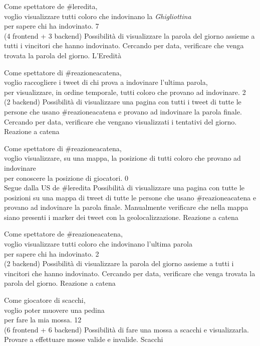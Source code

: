 \userstory%
{Come spettatore de \#leredita,\\voglio visualizzare tutti coloro che indovinano la \textit{Ghigliottina}\\per sapere chi ha indovinato.}%
{7\\(4 frontend + 3 backend)}%
{Possibilità di visualizzare la parola del giorno assieme a tutti i vincitori che hanno indovinato.}%
{Cercando per data, verificare che venga trovata la parola del giorno.}
{L'Eredità}

\userstory%
{Come spettatore di \#reazioneacatena,\\voglio raccogliere i tweet di chi prova a indovinare l'ultima parola,\\per visualizzare, in ordine temporale, tutti coloro che provano ad indovinare.}%
{2\\(2 backend)}%
{Possibilità di visualizzare una pagina con tutti i tweet di tutte le persone che usano \#reazioneacatena e provano ad indovinare la parola finale.}%
{Cercando per data, verificare che vengano visualizzati i tentativi del giorno.}
{Reazione a catena}

\userstory%
{Come spettatore di \#reazioneacatena,\\voglio visualizzare, su una mappa, la posizione di tutti coloro che provano ad indovinare\\per conoscere la posizione di giocatori.}%
{0\\Segue dalla US de \#leredita}%
{Possibilità di visualizzare una pagina con tutte le posizioni su una mappa di tweet di tutte le persone che usano \#reazioneacatena e provano ad indovinare la parola finale.}%
{Manualmente verificare che nella mappa siano presenti i marker dei tweet con la geolocalizzazione.}
{Reazione a catena}

\userstory%
{Come spettatore de \#reazioneacatena,\\voglio visualizzare tutti coloro che indovinano l'ultima parola\\per sapere chi ha indovinato.}%
{2\\(2 backend)}%
{Possibilità di visualizzare la parola del giorno assieme a tutti i vincitori che hanno indovinato.}%
{Cercando per data, verificare che venga trovata la parola del giorno.}
{Reazione a catena}

\userstory%
{Come giocatore di scacchi,\\voglio poter muovere una pedina\\per fare la mia mossa.}%
{12\\(6 frontend + 6 backend)}%
{Possibilità di fare una mossa a scacchi e visualizzarla.}%
{Provare a effettuare mosse valide e invalide.}
{Scacchi}


